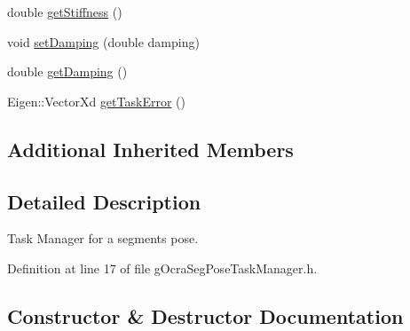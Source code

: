 \begin{DoxyCompactItemize}
\item 
double \hyperlink{classgocra_1_1gOcraSegPoseTaskManager_a1fabad2f6aef0f4e3088225ba71555a5}{get\+Stiffness} ()
\item 
void \hyperlink{classgocra_1_1gOcraSegPoseTaskManager_af1c9cd4b30f956ef607c19a7756c71f9}{set\+Damping} (double damping)
\item 
double \hyperlink{classgocra_1_1gOcraSegPoseTaskManager_af8a42a3b2f546377095c6c7a5849ef58}{get\+Damping} ()
\item 
Eigen\+::\+Vector\+Xd \hyperlink{classgocra_1_1gOcraSegPoseTaskManager_a059b69af0a960110bb14863f0179b1cd}{get\+Task\+Error} ()
\end{DoxyCompactItemize}
\subsection*{Additional Inherited Members}


\subsection{Detailed Description}
Task Manager for a segment\textquotesingle{}s pose. 



Definition at line 17 of file g\+Ocra\+Seg\+Pose\+Task\+Manager.\+h.



\subsection{Constructor \& Destructor Documentation}
\hypertarget{classgocra_1_1gOcraSegPoseTaskManager_a9756a704f7ac1b45084ed1aa44ffc805}{}\label{classgocra_1_1gOcraSegPoseTaskManager_a9756a704f7ac1b45084ed1aa44ffc805} 

